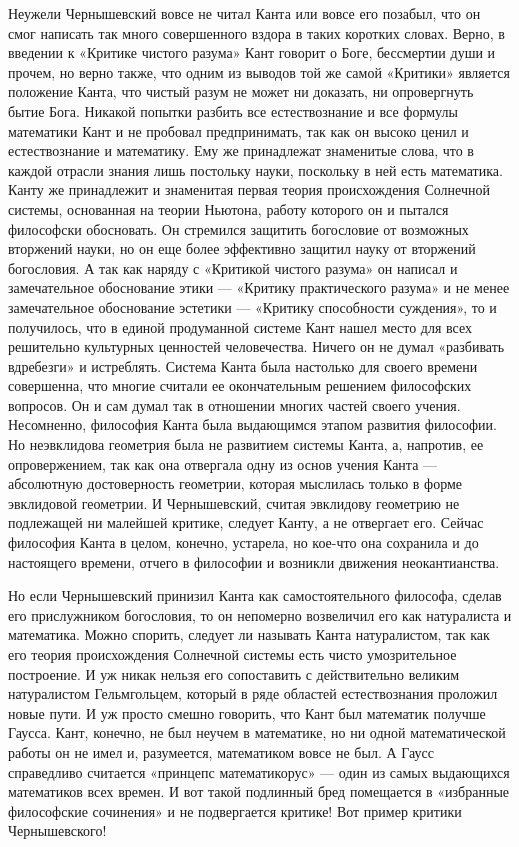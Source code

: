 Неужели Чернышевский вовсе не читал Канта или вовсе его позабыл, что он смог
написать так много совершенного вздора в таких коротких словах. Верно, в
введении к «Критике чистого разума» Кант говорит о Боге, бессмертии души и
прочем, но верно также, что одним из выводов той же самой «Критики» является
положение Канта, что чистый разум не может ни доказать, ни опровергнуть бытие
Бога. Никакой попытки разбить все естествознание и все формулы математики Кант
и не пробовал предпринимать, так как он высоко ценил и естествознание и
математику. Ему же принадлежат знаменитые слова, что в каждой отрасли знания
лишь постольку науки, поскольку в ней есть математика. Канту же принадлежит и
знаменитая первая теория происхождения Солнечной системы, основанная на теории
Ньютона, работу которого он и пытался философски обосновать. Он стремился
защитить богословие от возможных вторжений науки, но он еще более эффективно
защитил науку от вторжений богословия. А так как наряду с «Критикой чистого
разума» он написал и замечательное обоснование этики --- «Критику практического
разума» и не менее замечательное обоснование эстетики --- «Критику способности
суждения», то и получилось, что в единой продуманной системе Кант нашел место
для всех решительно культурных ценностей человечества. Ничего он не думал
«разбивать вдребезги» и истреблять. Система Канта была настолько для своего
времени совершенна, что многие считали ее окончательным решением философских
вопросов. Он и сам думал так в отношении многих частей своего учения.
Несомненно, философия Канта была выдающимся этапом развития философии. Но
неэвклидова геометрия была не развитием системы Канта, а, напротив, ее
опровержением, так как она отвергала одну из основ учения Канта --- абсолютную
достоверность геометрии, которая мыслилась только в форме эвклидовой геометрии.
И Чернышевский, считая эвклидову геометрию не
подлежащей ни малейшей критике, следует Канту, а не отвергает его. Сейчас
философия Канта в целом, конечно, устарела, но кое-что она сохранила и до
настоящего времени, отчего в философии и возникли движения неокантианства.

Но если Чернышевский принизил Канта как самостоятельного философа, сделав его
прислужником богословия, то он непомерно возвеличил его как натуралиста и
математика. Можно спорить, следует ли называть Канта натуралистом, так как его
теория происхождения Солнечной системы есть чисто умозрительное построение. И
уж никак нельзя его сопоставить с действительно великим натуралистом
Гельмгольцем, который в ряде областей естествознания проложил новые пути. И уж
просто смешно говорить, что Кант был математик получше Гаусса. Кант, конечно,
не был неучем в математике, но ни одной математической работы он не имел и,
разумеется, математиком вовсе не был. А Гаусс справедливо считается «принцепс
математикорус» --- один из самых выдающихся математиков всех времен. И вот такой
подлинный бред помещается в «избранные философские сочинения» и не подвергается
критике! Вот пример критики Чернышевского!


